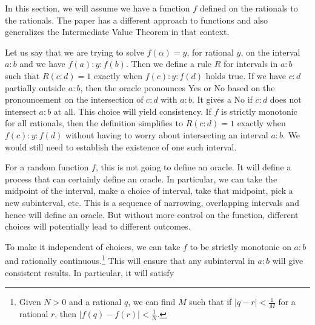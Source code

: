 \documentclass[12pt]{article}
\begin{document}
In this section, we will assume we have a function $f$ defined on the rationals to the rationals. The paper \cite{taylor23funora} has a different approach to functions and also generalizes the Intermediate Value Theorem in that context. 

Let us say that we are trying to solve $f(\alpha) = y$, for rational $y$, on the interval $a:b$ and we have $f(a):y:f(b)$. Then we define a rule $R$ for intervals in $a:b$ such that $R(c:d) = 1$ exactly when $f(c):y:f(d)$ holds true. If we have $c:d$ partially outside $a:b$, then the oracle pronounces Yes or No based on the pronouncement on the intersection of $c:d$ with $a:b$. It gives a No if $c:d$ does not intersect $a:b$ at all. This choice will yield consistency. If $f$ is strictly monotonic for all rationals, then the definition simplifies to $R(c:d)=1$ exactly when $f(c):y:f(d)$ without having to worry about intersecting an interval $a:b$. We would still need to establish the existence of one such interval. 

For a random function $f$, this is not going to define an oracle. It will define a process that can certainly define an oracle. In particular, we can take the midpoint of the interval, make a choice of interval, take that midpoint, pick a new subinterval, etc. This is a sequence of narrowing, overlapping intervals and hence will define an oracle. But without more control on the function, different choices will potentially lead to different outcomes. 

To make it independent of choices, we can take $f$ to be strictly monotonic on $a:b$ and rationally continuous.\footnote{Given $N >0$ and a rational $q$, we can find $M$ such that if $|q-r|<\frac{1}{M}$ for a rational $r$, then $|f(q)-f(r)| < \frac{1}{N}$.} This will ensure that any subinterval in $a:b$ will give consistent results. In particular, it will satisfy
\end{document}
